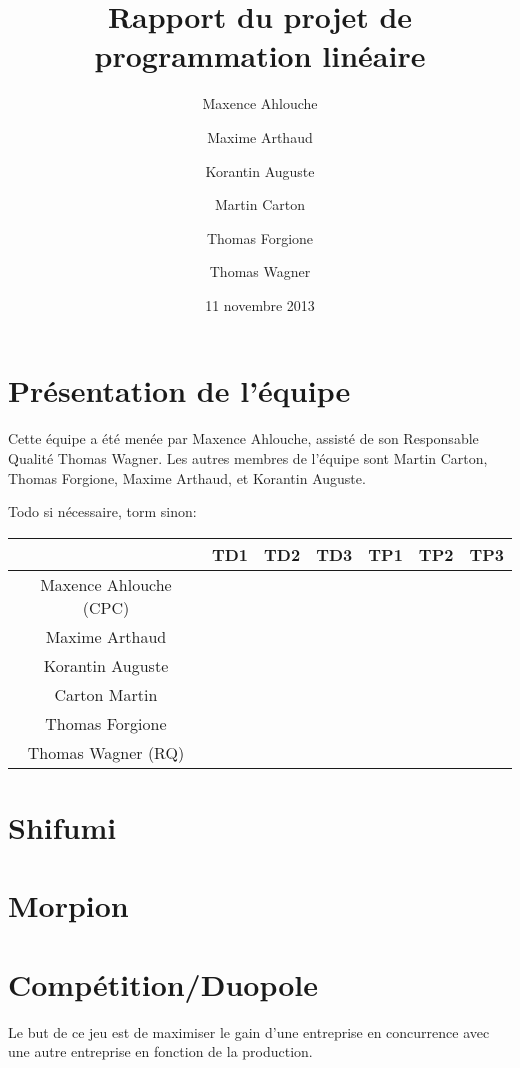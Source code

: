 \documentclass{scrartcl}
\begin{document}
\title{Rapport du projet de programmation linéaire}
\author{Maxence Ahlouche \and Maxime Arthaud \and Korantin Auguste
          \and Martin Carton \and Thomas Forgione \and Thomas Wagner}
\date{11 novembre 2013}
\maketitle
\tableofcontents
\lstlistoflistings
\newpage

\section{Présentation de l'équipe}
  Cette équipe a été menée par Maxence Ahlouche, assisté de son Responsable
  Qualité Thomas Wagner. Les autres membres de l'équipe sont Martin Carton,
  Thomas Forgione, Maxime Arthaud, et Korantin Auguste.

  Todo si nécessaire, torm sinon:
  \begin{table}[h]
    \centering
    \begin{tabular}{|c||c|c|c||c|c|c|}
      \hline
      & TD1 & TD2 & TD3 & TP1 & TP2 & TP3 \\
      \hline\hline
      Maxence Ahlouche (CPC) & & & & & & \\
      \hline
      Maxime Arthaud & & & & & & \\
      \hline
      Korantin Auguste &&&&&& \\
      \hline
      Carton Martin &&&&&&\\
      \hline
      Thomas Forgione &&&&&&\\
      \hline
      Thomas Wagner (RQ) &&&&&&\\
      \hline
    \end{tabular}
  \end{table}

\section{Shifumi}
\section{Morpion}
\section{Compétition/Duopole}
  Le but de ce jeu est de maximiser le gain d'une entreprise en concurrence avec
  une autre entreprise en fonction de la production.
\end{document}

